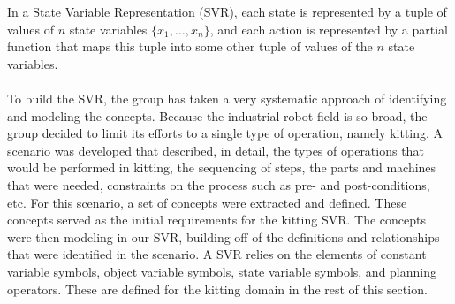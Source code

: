 

In a State Variable Representation (SVR), each state is represented by a tuple of values of $n$ state variables $\lbrace x_1,\dots,x_n\rbrace$, and each action is represented by a partial function that maps this tuple into some other tuple of values of the $n$ state variables.\\ \\
To build the SVR, the group has taken a very systematic approach of identifying and modeling the concepts. Because the industrial robot field is so broad, the group decided to limit its efforts to a single type of operation, namely kitting. A scenario was developed that described, in detail, the types of operations that would be performed in kitting, the sequencing of steps, the parts and machines that were needed, constraints on the process such as pre- and post-conditions, etc. For this scenario, a set of concepts were extracted and defined. These concepts served as the initial requirements for the kitting SVR. The concepts were then modeling in our SVR, building off of the definitions and relationships that were identified in the scenario. A SVR relies on the elements of constant variable symbols, object variable symbols, state variable symbols, and planning operators. These are defined for the kitting domain in the rest of this section.


